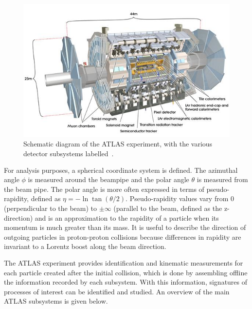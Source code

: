 \begin{figure}
    \centering
    \includegraphics[width = \textwidth]{figures/atlas_diagram.png}
    \caption{Schematic diagram of the ATLAS experiment, with the various detector subsystems labelled~\cite{collaboration_atlas_2008}.}
    \label{fig:atlas}
\end{figure}

For analysis purposes, a spherical coordinate system is defined. The azimuthal angle $\phi$ is measured around the beampipe and the polar angle $\theta$ is measured from the beam pipe. The polar angle is more often expressed in terms of pseudo-rapidity, defined as $\eta = -\ln\tan\left(\theta/2\right)$.  Pseudo-rapidity values vary from 0 (perpendicular to the beam) to $\pm\infty$ (parallel to the beam, defined as the z-direction) and is an approximation to the rapidity of a particle when its momentum is much greater than its mass. It is useful to describe the direction of outgoing particles in proton-proton collisions because differences in rapidity are invariant to a Lorentz boost along the beam direction.

The ATLAS experiment provides identification and kinematic measurements for each particle created after the initial collision, which is done by assembling offline the information recorded by each subsystem. With this information, signatures of processes of interest can be identified and studied. An overview of the main ATLAS subsystems is given below.

